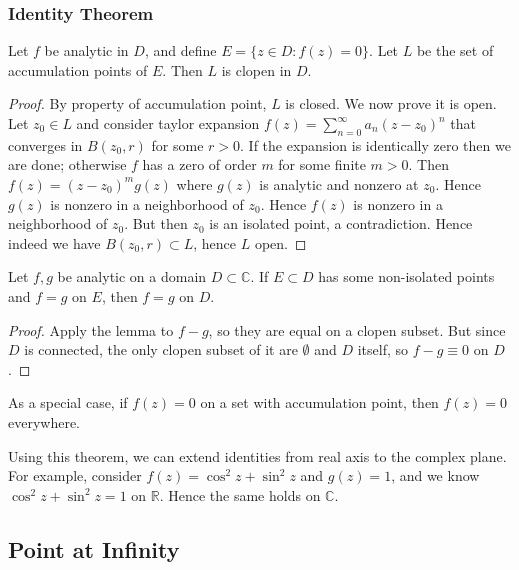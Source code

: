 \subsubsection{Identity Theorem}
\begin{lemma}
	Let $f$ be analytic in $D$, and define $E = \{z \in D: f(z) = 0\} $. Let $L$ be the set of accumulation points of $E$. Then $L$ is clopen in $D$.
\end{lemma}
\begin{proof}
	By property of accumulation point, $L$ is closed. We now prove it is open. Let $z_0 \in L$ and consider taylor expansion $f(z) = \sum_{n=0}^{\infty} a_n (z-z_0)^n$ that converges in $B(z_0, r)$ for some $r>0$. If the expansion is identically zero then we are done; otherwise $f$ has a zero of order $m$ for some finite $m>0$. Then $f(z) = (z-z_0)^m g(z)$ where $g(z)$ is analytic and nonzero at $z_0$. Hence $g(z)$ is nonzero in a neighborhood of $z_0$. Hence $f(z)$ is nonzero in a neighborhood of $z_0$. But then $z_0$ is an isolated point, a contradiction. Hence indeed we have  $B(z_0, r) \subset L$, hence $L$ open.
\end{proof}

\begin{theorem}
	Let $f, g$ be analytic on a domain $D \subset \mathbb{C}$. If $E \subset D$ has some non-isolated points and $f = g$ on $E$, then $f = g$ on $D$.
\end{theorem}
\begin{proof}
	Apply the lemma to $f-g$, so they are equal on a clopen subset. But since $D$ is connected, the only clopen subset of it are $\emptyset $ and $D$ itself, so $f-g \equiv 0$ on $D$.
\end{proof}

\begin{example}
	As a special case, if $f(z) = 0$ on a set with accumulation point, then $f(z) = 0$ everywhere.
\end{example}
\begin{example}
	Using this theorem, we can extend identities from real axis to the complex plane. For example, consider $f(z) = \cos^2 z + \sin^2 z$ and $g(z) = 1$, and we know $\cos^2 z + \sin^2 z = 1$ on $\mathbb{R}$. Hence the same holds on $\mathbb{C}$.
\end{example}

\subsection{Point at Infinity}

